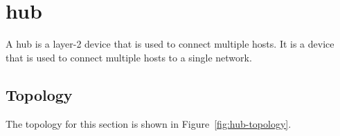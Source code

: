 \section{hub}

A hub is a layer-2 device that is used to connect multiple hosts. It
is a device that is used to connect multiple hosts to a single network.

\subsection{Topology}

The topology for this section is shown in Figure~\ref{fig:hub-topology}.

